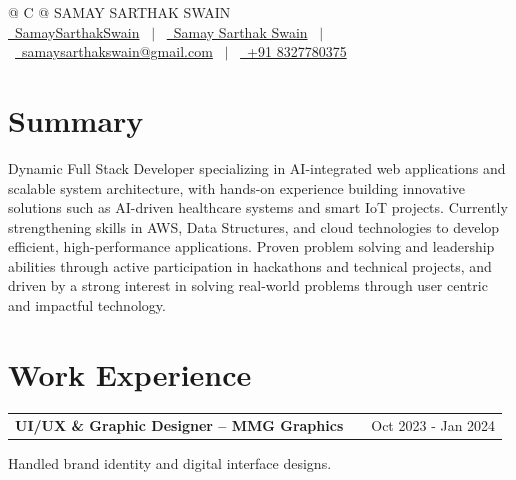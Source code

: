 \documentclass[a4paper,12pt]{article}
\makeatletter
\newenvironment{jobshort}[2]
{
\begin{tabularx}{\linewidth}{@{}l X r@{}}
\textbf{#1} & \hfill &  #2 \\[3.75pt]
\end{tabularx}
}
{
}
\makeatother
\begin{document}
\pagestyle{empty}


\begin{tabularx}{\linewidth}{@{} C @{}}
\Huge{SAMAY SARTHAK SWAIN} \\[7.5pt]

\href{https://github.com/SamaySarthakSwain}{\raisebox{-0.05\height}\faGithub\ SamaySarthakSwain} \ $|$ \
\href{https://www.linkedin.com/in/samay-sarthak-swain-b9a277330}{\raisebox{-0.05\height}\faLinkedin\ Samay Sarthak Swain} \ $|$ \
\href{mailto:samaysarthakswain@gmail.com}{\raisebox{-0.05\height}\faEnvelope\ samaysarthakswain@gmail.com} \ $|$ \
\href{tel:+918327780375}{\raisebox{-0.05\height}\faMobile\ +91 8327780375} \\

\end{tabularx}


\section{Summary}
Dynamic Full Stack Developer specializing in AI-integrated web applications and scalable system architecture, with hands-on experience building innovative solutions such as AI-driven healthcare systems and smart IoT projects. Currently strengthening skills in AWS, Data Structures, and cloud technologies to develop efficient, high-performance applications. Proven problem solving and leadership abilities through active participation in hackathons and technical projects, and driven by a strong interest in solving real-world problems through user centric and impactful technology.


\section{Work Experience}

\begin{jobshort}{UI/UX \& Graphic Designer -- MMG Graphics}{Oct 2023 - Jan 2024}
Handled brand identity and digital interface designs.
\end{jobshort}
\end{document}
